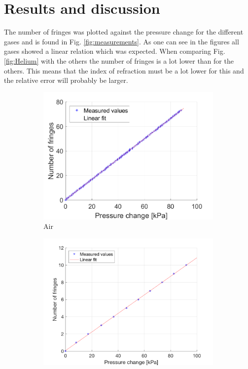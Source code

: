\section{Results and discussion}
The number of fringes was plotted against the pressure change for the different gases and is found in Fig. \ref{fig:measurements}. As one can see in the figures all gases showed a linear relation which was expected. When comparing Fig. \ref{fig:Helium} with the others the number of fringes is a lot lower than for the others. This means that the index of refraction must be a lot lower for this and the relative error will probably be larger. 

\begin{figure}[H]
  \centering
  \begin{subfigure}{0.49\textwidth}
    \includegraphics[width=\textwidth]{matlab/Air}
    \caption{Air}
    \label{fig:Air}
  \end{subfigure}
  \begin{subfigure}{0.49\textwidth}
    \includegraphics[width=\textwidth]{matlab/Helium}

\end{subfigure}
\end{figure}
